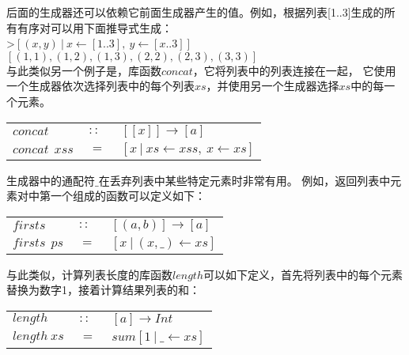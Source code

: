 后面的生成器还可以依赖它前面生成器产生的值。例如，根据列表[1..3]生成的所有有序对可以用下面推导式生成：\\

\noindent\hspace*{1cm}>$[(x,y)~|~x\leftarrow [1..3],~y\leftarrow [x..3]]$\\
\hspace*{1cm}$[(1,1),(1,2),(1,3),(2,2),(2,3),(3,3)]$\\

与此类似另一个例子是，库函数$concat$，它将列表中的列表连接在一起， 它使用一个生成器依次选择列表中的每个列表$xs$，并使用另一个生成器选择$xs$中的每一个元素。\\

\begin{tabular}[t]{lll}
  $concat$&$~::~$&$[[x]]\rightarrow [a]$\\
  $concat~~xss$&$~=~$&$[x~|~xs \leftarrow xss,~x\leftarrow xs]$
\end{tabular}




生成器中的通配符$\_$在丢弃列表中某些特定元素时非常有用。 例如，返回列表中元素对中第一个组成的函数可以定义如下：

\begin{tabular}[t]{lll}
  $firsts$&$~::~$&$[(a,b)] \rightarrow [a]$\\
  $firsts~~ps$&$~=~$&$[x~|~(x,\_ ) \leftarrow xs]$\\
\end{tabular}

\noindent 与此类似，计算列表长度的库函数$length$可以如下定义，首先将列表中的每个元素替换为数字1，接着计算结果列表的和：

\begin{tabular}[t]{lll}
$length$&$~::~$&$[a]\rightarrow Int$\\
$length~xs$&$~=~$&$sum[1~|~\_ \leftarrow xs]$\\  
\end{tabular}\\

